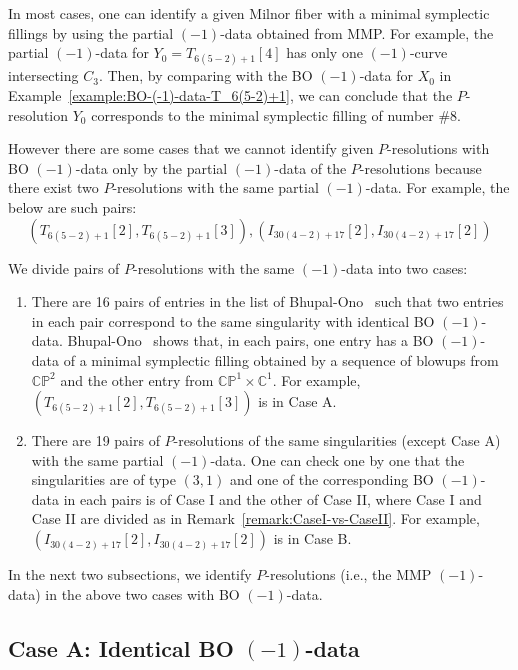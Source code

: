\documentclass[reqno, twoside, a4paper]{amsart}
\theoremstyle{definition}
\numberwithin{equation}{section}
\begin{document}
In most cases, one can identify a given Milnor fiber with a minimal symplectic fillings by using the partial $(-1)$-data obtained from MMP. For example, the partial $(-1)$-data for $Y_0=T_{6(5-2)+1}[4]$ has only one $(-1)$-curve intersecting $C_3$. Then, by comparing with the BO $(-1)$-data for $X_0$ in Example~\ref{example:BO-(-1)-data-T_6(5-2)+1}, we can conclude that the $P$-resolution $Y_0$ corresponds to the minimal symplectic filling of number \#8.

However there are some cases that we cannot identify given $P$-resolutions with BO $(-1)$-data only by the partial $(-1)$-data of the $P$-resolutions because there exist two $P$-resolutions with the same partial $(-1)$-data. For example, the below are such pairs:
%
\[(T_{6(5-2)+1}[2], T_{6(5-2)+1}[3]), (I_{30(4-2)+17}[2],I_{30(4-2)+17}[2])\]

We divide pairs of $P$-resolutions with the same $(-1)$-data into two cases:

\begin{enumerate}[{Case} A.]
\item There are 16 pairs of entries in the list of Bhupal-Ono~\cite[\S5]{Bhupal-Ono-2012} such that two entries in each pair correspond to the same singularity with identical BO $(-1)$-data. Bhupal-Ono~\cite{Bhupal-Ono-2012} shows that, in each pairs, one entry has a BO $(-1)$-data of a minimal symplectic filling obtained by a sequence of blowups from $\mathbb{CP}^2$ and the other entry from $\mathbb{CP}^1 \times \mathbb{C}^1$. For example, $(T_{6(5-2)+1}[2], T_{6(5-2)+1}[3])$ is in Case A.

\item There are 19 pairs of $P$-resolutions of the same singularities (except Case A) with the same partial $(-1)$-data. One can check one by one that the singularities are of type $(3,1)$ and one of the corresponding BO $(-1)$-data in each pairs is of Case I and the other of Case II, where Case I and Case II are divided as in Remark~\ref{remark:CaseI-vs-CaseII}. For example, $(I_{30(4-2)+17}[2],I_{30(4-2)+17}[2])$ is in Case B.
\end{enumerate}

In the next two subsections, we identify $P$-resolutions (i.e., the MMP $(-1)$-data) in the above two cases with BO $(-1)$-data.






\subsection{Case A: Identical BO $(-1)$-data}
\end{document}
